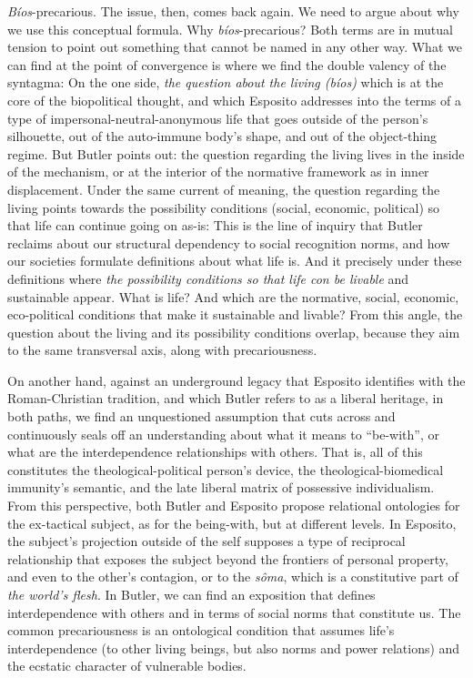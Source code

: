 \documentclass[a4paper,]{scrartcl}
\begin{document}
\emph{Bíos}-precarious. The issue, then, comes back again. We need to
argue about why we use this conceptual formula. Why
\emph{bíos}-precarious? Both terms are in mutual tension to point out
something that cannot be named in any other way. What we can find at the
point of convergence is where we find the double valency of the
syntagma: On the one side, \emph{the question about the living (bíos)}
which is at the core of the biopolitical thought, and which Esposito
addresses into the terms of a type of impersonal-neutral-anonymous life
that goes outside of the person's silhouette, out of the auto-immune
body's shape, and out of the object-thing regime. But Butler points out:
the question regarding the living lives in the inside of the mechanism,
or at the interior of the normative framework as in inner displacement.
Under the same current of meaning, the question regarding the living
points towards the possibility conditions (social, economic, political)
so that life can continue going on as-is: This is the line of inquiry
that Butler reclaims about our structural dependency to social
recognition norms, and how our societies formulate definitions about
what life is. And it precisely under these definitions where \emph{the
possibility conditions so that life con be livable} and sustainable
appear. What is life? And which are the normative, social, economic,
eco-political conditions that make it sustainable and livable? From this
angle, the question about the living and its possibility conditions
overlap, because they aim to the same transversal axis, along with
precariousness.

On another hand, against an underground legacy that Esposito identifies
with the Roman-Christian tradition, and which Butler refers to as a
liberal heritage, in both paths, we find an unquestioned assumption that
cuts across and continuously seals off an understanding about what it
means to ``be-with'', or what are the interdependence relationships with
others. That is, all of this constitutes the theological-political
person's device, the theological-biomedical immunity's semantic, and the
late liberal matrix of possessive individualism. From this perspective,
both Butler and Esposito propose relational ontologies for the
ex-tactical subject, as for the being-with, but at different levels. In
Esposito, the subject's projection outside of the self supposes a type
of reciprocal relationship that exposes the subject beyond the frontiers
of personal property, and even to the other's contagion, or to the
\emph{sôma}, which is a constitutive part of \emph{the world's flesh}.
In Butler, we can find an exposition that defines interdependence with
others and in terms of social norms that constitute us. The common
precariousness is an ontological condition that assumes life's
interdependence (to other living beings, but also norms and power
relations) and the ecstatic character of vulnerable bodies.
\end{document}

